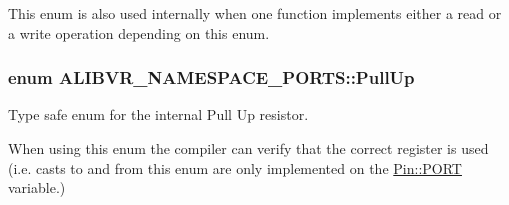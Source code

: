 This enum is also used internally when one function implements either a read or a write operation depending on this enum. 
\subsubsection[{\texorpdfstring{Pull\+Up}{PullUp}}]{\setlength{\rightskip}{0pt plus 5cm}enum {\bf A\+L\+I\+B\+V\+R\+\_\+\+N\+A\+M\+E\+S\+P\+A\+C\+E\+\_\+\+P\+O\+R\+T\+S\+::\+Pull\+Up}\hspace{0.3cm}{\ttfamily [strong]}}\hypertarget{namespaceALIBVR__NAMESPACE__PORTS_ac5b094ab18f4038d56ff1401ebe8d4f3}{}\label{namespaceALIBVR__NAMESPACE__PORTS_ac5b094ab18f4038d56ff1401ebe8d4f3}


Type safe enum for the internal Pull Up resistor. 

When using this enum the compiler can verify that the correct register is used (i.\+e. casts to and from this enum are only implemented on the \hyperlink{structALIBVR__NAMESPACE__PORTS_1_1Pin_aaa60d0cc181d9170487e5429a3c63227}{Pin\+::\+P\+O\+RT} variable.) 